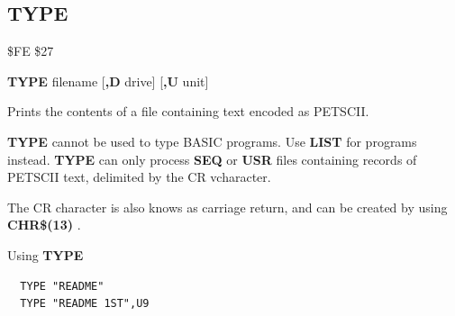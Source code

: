 
\newpage
\subsection{TYPE}
\begin{description}[leftmargin=2cm,style=nextline]
\item [Token:] \$FE \$27
\item [Format:] {\bf TYPE} filename [{\bf,D} drive] [{\bf,U} unit]
\item [Usage:] Prints the contents of a file containing
               text encoded as PETSCII.

   \filenamedefinition

   \drivedefinition

   \unitdefinition

\item [Remarks:] {\bf TYPE} cannot be used to type
                 BASIC programs. Use {\bf LIST} for programs instead.
                 {\bf TYPE} can only process {\bf SEQ} or {\bf USR} files
                 containing records of PETSCII text, delimited
                 by the CR vcharacter.

                 The CR character is also knows as carriage return, and can
                 be created by using {\bf CHR\$(13)} .

\item [Example:] Using {\bf TYPE}
\begin{tcolorbox}[colback=black,coltext=white]
\verbatimfont{\codefont}
\begin{verbatim}
  TYPE "README"
  TYPE "README 1ST",U9
\end{verbatim}
\end{tcolorbox}
\end{description}


\newpage
